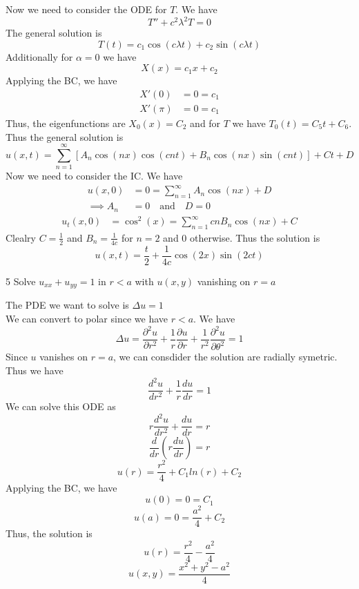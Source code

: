 \documentclass[answers,12pt,addpoints]{exam}
\begin{document}
\begin{questions}
\begin{solution}
        Now we need to consider the ODE for $T$. We have
        \[ T'' + c^2\lambda^2T = 0 \]
        The general solution is
        \[ T(t) = c_1 \cos(c\lambda t) + c_2 \sin(c\lambda t) \]
        Additionally for $\alpha = 0$ we have
        \[ X(x) = c_1 x + c_2 \]
        Applying the BC, we have
        \begin{align*}
            X'(0) &= 0 = c_1 \\
            X'(\pi) &= 0 = c_1 
        \end{align*}
        Thus, the eigenfunctions are $X_0(x) = C_2 $ and for $T$ we have $T_0(t) = C_5 t + C_6$. 
        Thus the general solution is
        \[ u(x,t) = \sum_{n=1}^{\infty} \left[ A_n \cos(n x) \cos(c n t) + B_n \cos(n x) \sin(c n t) \right] + C t + D \] 
        Now we need to consider the IC. We have
        \begin{align*}
            u(x,0) &= 0 = \sum_{n=1}^{\infty} A_n \cos(n x) + D \\
            \implies A_n &= 0 \quad \text{and} \quad D = 0
        \end{align*}
        \begin{align*}
            u_t(x,0) &= \cos^2(x) = \sum_{n=1}^{\infty} c n B_n \cos(n x) + C
        \end{align*}
        Clealry $C = \frac{1}{2}$ and $B_n = \frac{1}{4c} $ for $n =2$ and $0$ otherwise. Thus the solution is
        \[ u(x,t) = \frac{t}{2} + \frac{1}{4c} \cos(2x) \sin(2ct) \]
    \end{solution}
     5
    Solve $u_{xx} + u_{yy} = 1$ in $r < a$ with $u(x, y)$ vanishing on $r = a$
    \begin{solution}
        The PDE we want to solve is $\Delta u = 1$ \\
        We can convert to polar since we have $r < a$. We have
        $$ \Delta u = \frac{\partial^2 u}{\partial r^2} + \frac{1}{r} \frac{\partial u}{\partial r} + \frac{1}{r^2} \frac{\partial^2 u}{\partial \theta^2} = 1$$
        Since $u$ vanishes on $r = a$, we can consdider the solution are radially symetric. Thus we have
        $$ \frac{d^2 u}{d r^2} + \frac{1}{r} \frac{d u}{d r} = 1$$
        We can solve this ODE as
        $$ r\frac{d^2 u}{d r^2} + \frac{d u}{d r} = r$$
        $$ \frac{d}{d r}(r\frac{d u}{d r}) = r$$
        $$ u(r) = \frac{r^2}{4} + C_1ln(r) + C_2$$
        Applying the BC, we have
        $$ u(0) = 0 = C_1$$
        $$ u(a) = 0 = \frac{a^2}{4} + C_2$$
        Thus, the solution is
        $$ u(r) = \frac{r^2}{4} - \frac{a^2}{4}$$
        $$ u(x,y) = \frac{x^2 + y^2 - a^2}{4}$$

\end{solution}
\end{questions}
\end{document}
